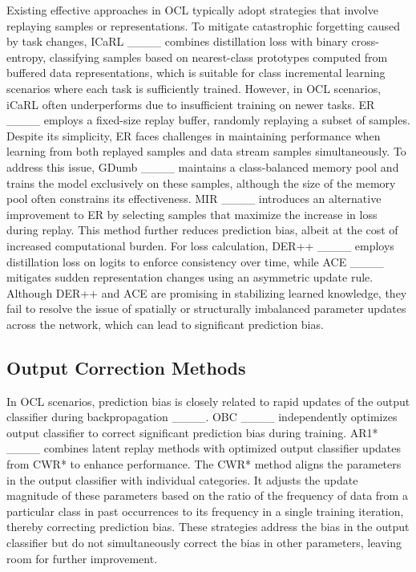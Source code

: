 Existing effective approaches in OCL typically adopt strategies that involve replaying samples or representations. To mitigate catastrophic forgetting caused by task changes, ICaRL ____ combines distillation loss with binary cross-entropy, classifying samples based on nearest-class prototypes computed from buffered data representations, which is suitable for class incremental learning scenarios where each task is sufficiently trained. However, in OCL scenarios, iCaRL often underperforms due to insufficient training on newer tasks. ER ____ employs a fixed-size replay buffer, randomly replaying a subset of samples. Despite its simplicity, ER faces challenges in maintaining performance when learning from both replayed samples and data stream samples simultaneously. To address this issue, GDumb ____ maintains a class-balanced memory pool and trains the model exclusively on these samples, although the size of the memory pool often constrains its effectiveness. MIR ____ introduces an alternative improvement to ER by selecting samples that maximize the increase in loss during replay. This method further reduces prediction bias, albeit at the cost of increased computational burden. For loss calculation, DER++ ____ employs distillation loss on logits to enforce consistency over time, while ACE ____ mitigates sudden representation changes using an asymmetric update rule. Although DER++ and ACE are promising in stabilizing learned knowledge, they fail to resolve the issue of spatially or structurally imbalanced parameter updates across the network, which can lead to significant prediction bias. 

\subsection{Output Correction Methods}
In OCL scenarios, prediction bias is closely related to rapid updates of the output classifier during backpropagation ____. OBC ____ independently optimizes output classifier to correct significant prediction bias during training. AR1* ____ combines latent replay methods with optimized output classifier updates from CWR* to enhance performance. The CWR* method aligns the parameters in the output classifier with individual categories. It adjusts the update magnitude of these parameters based on the ratio of the frequency of data from a particular class in past occurrences to its frequency in a single training iteration, thereby correcting prediction bias. These strategies address the bias in the output classifier but do not simultaneously correct the bias in other parameters, leaving room for further improvement. 

